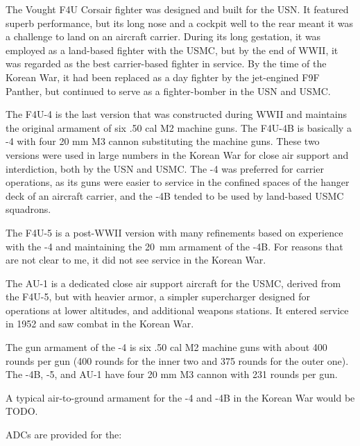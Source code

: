 
The Vought F4U Corsair fighter was designed and built for the USN. It featured superb performance, but its long nose and a cockpit well to the rear meant it was a challenge to land on an aircraft carrier. During its long gestation, it was employed as a land-based fighter with the USMC, but by the end of WWII, it was regarded as the best carrier-based fighter in service. By the time of the Korean War, it had been replaced as a day fighter by the jet-engined F9F Panther, but continued to serve as a fighter-bomber in the USN and USMC.

The F4U-4 is the last version that was constructed during WWII and maintains the original armament of six .50 cal M2 machine guns. The F4U-4B is basically a -4 with four 20 mm M3 cannon substituting the machine guns. These two versions were used in large numbers in the Korean War for close air support and interdiction, both by the USN and USMC. The -4 was preferred for carrier operations, as its guns were easier to service in the confined spaces of the hanger deck of an aircraft carrier, and the -4B tended to be used by land-based USMC squadrons.

The F4U-5 is a post-WWII version with many refinements based on experience with the -4 and maintaining the 20~mm armament of the -4B. For reasons that are not clear to me, it did not see service in the Korean War.

The AU-1 is a dedicated close air support aircraft for the USMC, derived from the F4U-5, but with heavier armor, a simpler supercharger designed for operations at lower altitudes, and additional weapons stations. It entered service in 1952 and saw combat in the Korean War.

The gun armament of the -4 is six .50 cal M2 machine guns with about 400 rounds per gun (400 rounds for the inner two and 375 rounds for the outer one). The -4B, -5, and AU-1 have four 20 mm M3 cannon with 231 rounds per gun. 

A typical air-to-ground armament for the -4 and -4B in the Korean War would be TODO. 

ADCs are provided for the:
\begin{adclist}
\end{adclist}
